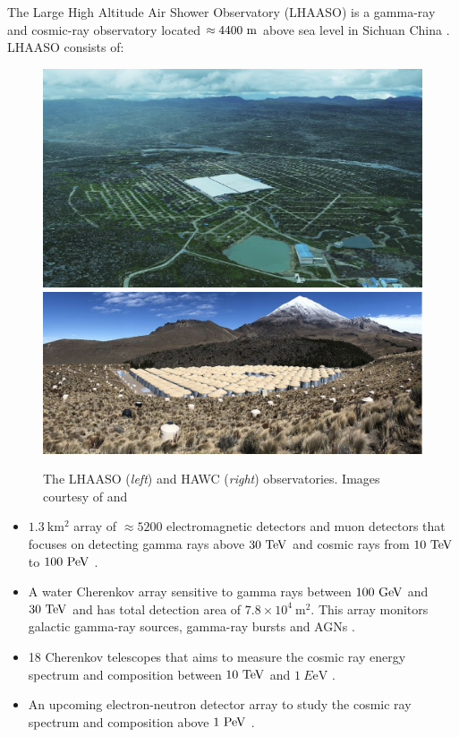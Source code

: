 The Large High Altitude Air Shower Observatory (LHAASO) is a gamma-ray and cosmic-ray observatory located $\approx 4400~\si{\meter}$ above sea level in Sichuan China \citep{2022ChPhC..46c0001M}. LHAASO consists of:
\begin{figure}[h!]
    \centering
    \includegraphics[height=0.15\textheight]{05_Astronomy/Images/telescopes/LHAASO.jpg}
    \includegraphics[height=0.15\textheight]{05_Astronomy/Images/telescopes/HAWC.png}
    \caption{The LHAASO (\textit{left}) and HAWC (\textit{right}) observatories. Images courtesy of \cite{2022ChPhC..46c0001M} and \cite{2023NIMPA105268253A}}
    \label{fig:my_label}
\end{figure}
\begin{itemize}
    \itemsep0em
    \item $1.3~\si{\kilo\meter\squared}$ array of $\approx 5200$ electromagnetic detectors and muon detectors that focuses on detecting gamma rays above $30~\TeV$ and cosmic rays from $10~\TeV$ to $100~\PeV$ \citep{2021ChPhC..45b5002A}.
    \item A water Cherenkov array sensitive to gamma rays between $100~\si{\giga\electronvolt}$ and $30~\TeV$ and has total detection area of $7.8\times 10^4~\si{\meter\squared}$. This array monitors galactic gamma-ray sources, gamma-ray bursts and AGNs \citep{2021arXiv210103508L}.
    \item 18 Cherenkov telescopes that aims to measure the cosmic ray energy spectrum and composition between $10~\TeV$ and $1~\si{E\electronvolt}$ \citep{2021EPJC...81..657A}.
    \item An upcoming electron-neutron detector array to study the cosmic ray spectrum and composition above $1~\PeV$ \citep{2022ChPhC..46c0001M}.
\end{itemize}
